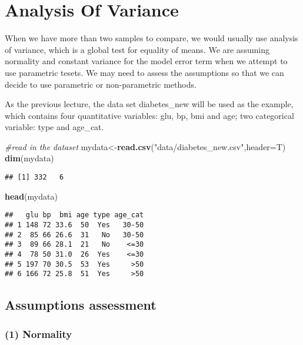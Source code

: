 \documentclass[]{book}
\newenvironment{Shaded}{\begin{snugshade}}{\end{snugshade}}
\newcommand{\KeywordTok}[1]{\textcolor[rgb]{0.13,0.29,0.53}{\textbf{#1}}}
\newcommand{\DataTypeTok}[1]{\textcolor[rgb]{0.13,0.29,0.53}{#1}}
\newcommand{\StringTok}[1]{\textcolor[rgb]{0.31,0.60,0.02}{#1}}
\newcommand{\CommentTok}[1]{\textcolor[rgb]{0.56,0.35,0.01}{\textit{#1}}}
\newcommand{\NormalTok}[1]{#1}
\theoremstyle{definition}
\theoremstyle{definition}
\theoremstyle{definition}
\theoremstyle{remark}
\begin{document}
\section{Analysis Of Variance}\label{analysis-of-variance}

When we have more than two samples to compare, we would usually use
analysis of variance, which is a global test for equality of means. We
are assuming normality and constant variance for the model error term
when we attempt to use parametric tesets. We may need to assess the
assumptions so that we can decide to use parametric or non-parametric
methods.

As the previous lecture, the data set diabetes\_new will be used as the
example, which contains four quantitative variables: glu, bp, bmi and
age; two categorical variable: type and age\_cat.

\begin{Shaded}
\begin{Highlighting}[]
\CommentTok{#read in the dataset}
\NormalTok{mydata<-}\KeywordTok{read.csv}\NormalTok{(}\StringTok{"data/diabetes_new.csv"}\NormalTok{,}\DataTypeTok{header=}\NormalTok{T)}
\KeywordTok{dim}\NormalTok{(mydata)}
\end{Highlighting}
\end{Shaded}

\begin{verbatim}
## [1] 332   6
\end{verbatim}

\begin{Shaded}
\begin{Highlighting}[]
\KeywordTok{head}\NormalTok{(mydata)}
\end{Highlighting}
\end{Shaded}

\begin{verbatim}
##   glu bp  bmi age type age_cat
## 1 148 72 33.6  50  Yes   30-50
## 2  85 66 26.6  31   No   30-50
## 3  89 66 28.1  21   No    <=30
## 4  78 50 31.0  26  Yes    <=30
## 5 197 70 30.5  53  Yes     >50
## 6 166 72 25.8  51  Yes     >50
\end{verbatim}

\subsection{Assumptions assessment}\label{assumptions-assessment}

\subsubsection{(1) Normality}\label{normality}
\end{document}

